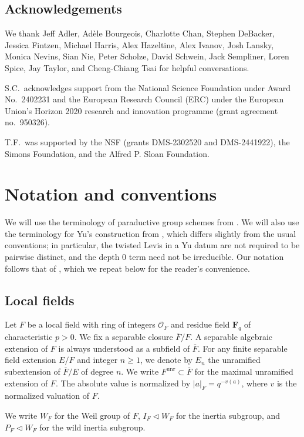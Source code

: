 \documentclass[reqno]{amsart}
\numberwithin{equation}{subsection}
\newcommand{\F}{\mathbf{F}}
\newcommand{\ol}[1]{\overline{#1}}
\newcommand\cO{\mathcal{O}}
\DeclareMathOperator{\unr}{unr}
\theoremstyle{remark}
\numberwithin{equation}{subsection}
\numberwithin{figure}{subsection}
\begin{document}
\subsection{Acknowledgements}

We thank Jeff Adler, Ad\`ele Bourgeois, Charlotte Chan, Stephen DeBacker, Jessica Fintzen, Michael Harris, Alex Hazeltine, Alex Ivanov, Josh Lansky, Monica Nevins, Sian Nie, Peter Scholze, David Schwein, Jack Sempliner, Loren Spice, Jay Taylor, and Cheng-Chiang Tsai for helpful conversations. 

S.C.~acknowledges support from the National Science Foundation under Award No.\ 2402231 and the European Research Council (ERC) under the
European Union’s Horizon 2020 research and innovation programme (grant agreement no.\ 950326).

T.F.~was supported by the NSF (grants DMS-2302520 and DMS-2441922), the Simons Foundation, and the Alfred P. Sloan Foundation. 




\section{Notation and conventions}\label{ssec:notation-fs}

We will use the terminology of paraductive group schemes from \cite{Cot26b}. We will also use the terminology for Yu's construction from \cite{CF26a}, which differs slightly from the usual conventions; in particular, the twisted Levis in a Yu datum are not required to be pairwise distinct, and the depth $0$ term need not be irreducible. Our notation follows that of \cite{CF26a}, which we repeat below for the reader's convenience. 
\subsection{Local fields}
Let $F$ be a local field with ring of integers $\cO_F$ and residue field $\F_q$ of characteristic $p > 0$. We fix a separable closure $\ol F/F$. A separable algebraic extension of $F$ is always understood as a subfield of $\ol F$. For any finite separable field extension $E/F$ and integer $n \geq 1$, we denote by $E_n$ the unramified subextension of $\ol F/E$ of degree $n$. We write $F^{\unr}\subset \ol F$ for the maximal unramified extension of $F$. The absolute value is normalized by $|a|_F=q^{-v(a)}$, where $v$ is the normalized valuation of $F$.

We write $W_F$ for the Weil group of $F$, $I_F \triangleleft W_F$ for the inertia subgroup, and $P_F \triangleleft W_F$ for the wild inertia subgroup. 
\end{document}
